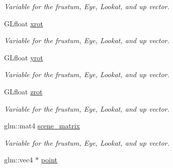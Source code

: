 \begin{DoxyCompactItemize}
\begin{DoxyCompactList}\small\item\em Variable for the frustum, Eye, Lookat, and up vector. \end{DoxyCompactList}\item 
G\+Lfloat \hyperlink{classcft_1_1Scene_a25254ead26ce3efe65d4719dd8624272}{xrot}\hypertarget{classcft_1_1Scene_a25254ead26ce3efe65d4719dd8624272}{}\label{classcft_1_1Scene_a25254ead26ce3efe65d4719dd8624272}

\begin{DoxyCompactList}\small\item\em Variable for the frustum, Eye, Lookat, and up vector. \end{DoxyCompactList}\item 
G\+Lfloat \hyperlink{classcft_1_1Scene_a68f7a6f9f750cbea7be01fca153353cd}{yrot}\hypertarget{classcft_1_1Scene_a68f7a6f9f750cbea7be01fca153353cd}{}\label{classcft_1_1Scene_a68f7a6f9f750cbea7be01fca153353cd}

\begin{DoxyCompactList}\small\item\em Variable for the frustum, Eye, Lookat, and up vector. \end{DoxyCompactList}\item 
G\+Lfloat \hyperlink{classcft_1_1Scene_a6c9f46de033985f342195a3554a4885d}{zrot}\hypertarget{classcft_1_1Scene_a6c9f46de033985f342195a3554a4885d}{}\label{classcft_1_1Scene_a6c9f46de033985f342195a3554a4885d}

\begin{DoxyCompactList}\small\item\em Variable for the frustum, Eye, Lookat, and up vector. \end{DoxyCompactList}\item 
glm\+::mat4 \hyperlink{classcft_1_1Scene_a1e1bc4dc1046eb7d799bf24e5ea13e93}{scene\+\_\+matrix}\hypertarget{classcft_1_1Scene_a1e1bc4dc1046eb7d799bf24e5ea13e93}{}\label{classcft_1_1Scene_a1e1bc4dc1046eb7d799bf24e5ea13e93}

\begin{DoxyCompactList}\small\item\em Variable for the frustum, Eye, Lookat, and up vector. \end{DoxyCompactList}\item 
glm\+::vec4 $\ast$ \hyperlink{classcft_1_1Scene_a377d9bbfd0047a9a07ea9347f507fb88}{point}\hypertarget{classcft_1_1Scene_a377d9bbfd0047a9a07ea9347f507fb88}{}\label{classcft_1_1Scene_a377d9bbfd0047a9a07ea9347f507fb88}


\end{DoxyCompactItemize}
